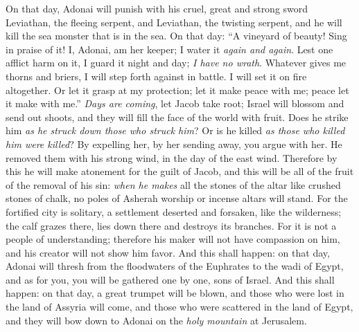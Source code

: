 \begin{biblechapter} %
 On that day, Adonai will punish with his cruel, great and strong sword Leviathan, the fleeing serpent, and Leviathan, the twisting serpent, and he will kill the sea monster that is in the sea.
\verse On that day:
\verse “A vineyard of beauty! Sing in praise of it!
\verse I, Adonai, am her keeper; 
I water it \textit{again and again}. 
Lest one afflict harm on it, 
I guard it night and day;
\verse \textit{I have no wrath}. 
Whatever gives me thorns and briers, 
I will step forth against in battle. 
I will set it on fire altogether.
\verse Or let it grasp at my protection; 
let it make peace with me; 
peace let it make with me.”
\verse \textit{Days are coming}, let Jacob take root; 
Israel will blossom and send out shoots, 
and they will fill the face of the world with fruit.
\verse Does he strike him \textit{as he struck down those who struck him}? 
Or is he killed \textit{as those who killed him were killed}?
\verse By expelling her, by her sending away, you argue with her. 
He removed them with his strong wind, 
in the day of the east wind.
\verse Therefore by this he will make atonement for the guilt of Jacob, 
and this will be all of the fruit of the removal of his sin: 
\textit{when he makes} all the stones of the altar like crushed stones of chalk, 
no poles of Asherah worship or incense altars will stand.
\verse For the fortified city is solitary, 
a settlement deserted and forsaken, like the wilderness; 
the calf grazes there, 
lies down there and destroys its branches. For it is not a people of understanding; therefore his maker will not have compassion on him, 
and his creator will not show him favor.
\verse And this shall happen: on that day, Adonai will thresh from the floodwaters of the Euphrates to the wadi of Egypt, and as for you, you will be gathered one by one, sons of Israel.
\verse And this shall happen: on that day, a great trumpet will be blown, and those who were lost in the land of Assyria will come, 
and those who were scattered in the land of Egypt, and they will bow down to Adonai on the \textit{holy mountain} at Jerusalem.
\end{biblechapter}

